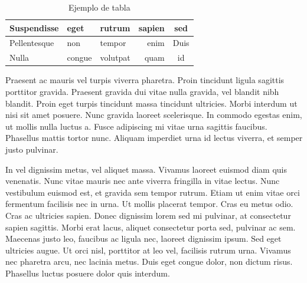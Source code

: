 \begin{table}
    \centering
    \begin{tabular}{|l|l|l|r|c|}
    \hline
    Suspendisse & eget & rutrum & sapien & sed \\
    \hline
    \hline
    Pellentesque & non & tempor & enim & Duis \\
    \hline
    Nulla & congue & volutpat & quam & id \\
    \hline
    \end{tabular}
    \caption{Ejemplo de tabla}
  \label{tab:tableexample}
\end{table}

Praesent ac mauris vel turpis viverra pharetra. Proin tincidunt ligula sagittis 
porttitor gravida. Praesent gravida dui vitae nulla gravida, vel blandit nibh 
blandit. Proin eget turpis tincidunt massa tincidunt ultricies. Morbi interdum 
ut nisi sit amet posuere. Nunc gravida laoreet scelerisque. In commodo egestas 
enim, ut mollis nulla luctus a. Fusce adipiscing mi vitae urna sagittis 
faucibus. Phasellus mattis tortor nunc. Aliquam imperdiet urna id lectus 
viverra, et semper justo pulvinar.

In vel dignissim metus, vel aliquet massa. Vivamus laoreet euismod diam quis 
venenatis. Nunc vitae mauris nec ante viverra fringilla in vitae lectus. Nunc 
vestibulum euismod est, et gravida sem tempor rutrum. Etiam ut enim vitae orci 
fermentum facilisis nec in urna. Ut mollis placerat tempor. Cras eu metus odio. 
Cras ac ultricies sapien. Donec dignissim lorem sed mi pulvinar, at consectetur 
sapien sagittis. Morbi erat lacus, aliquet consectetur porta sed, pulvinar ac 
sem. Maecenas justo leo, faucibus ac ligula nec, laoreet dignissim ipsum. Sed 
eget ultricies augue. Ut orci nisl, porttitor at leo vel, facilisis rutrum urna. 
Vivamus nec pharetra arcu, nec lacinia metus. Duis eget congue dolor, non dictum 
risus. Phasellus luctus posuere dolor quis interdum.

